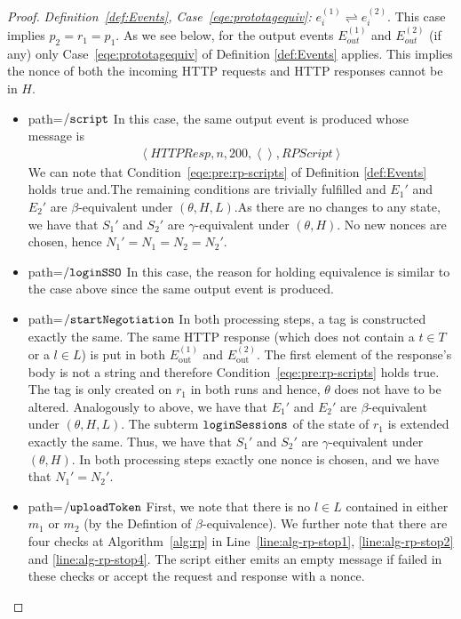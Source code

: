 \begin{proof}
    \noindent \emph{Definition~\ref{def:Events}, Case~\ref{eqe:prototagequiv}:}
    $e_i^{(1)}\rightleftharpoons e_i^{(2)}$. This case implies 
    $p_2=r_1=p_1$. As we see below, for the output events 
    $E_{out}^{(1)}$ and $E_{out}^{(2)}$ (if any) only 
    Case~\ref{eqe:prototagequiv} of Definition \ref{def:Events} 
    applies. This implies the nonce of both the incoming HTTP 
    requests and HTTP responses cannot be in $H$.
    \begin{itemize}
      \item path=$\mathtt{/script}$ 
        In this case, the same output 
        event is produced whose message is 
        \begin{equation}
          \begin{aligned}
            \left\langle HTTPResp,n,200,\left\langle\right\rangle,RPScript\right\rangle
          \end{aligned}
        \end{equation}
        We can note that Condition~\ref{eqe:pre:rp-scripts} of 
        Definition \ref{def:Events} 
        holds true and.The remaining conditions are trivially 
        fulfilled and $E_1\prime$ and $E_2\prime$ are 
        $\beta$-equivalent under $(\theta,H,L)$.As there are no 
        changes to any state, we have that $S_1\prime$ and 
        $S_2\prime$ are $\gamma$-equivalent under $(\theta,H)$. 
        No new nonces are chosen, hence $N_1\prime=N_1=N_2=N_2\prime$.
      \item path=$\mathtt{/loginSSO}$ 
        In this case, the reason for holding equivalence is 
        similar to the case above since the same output event 
        is produced.
      \item path=$\mathtt{/startNegotiation}$ 
        In both processing steps, a tag is constructed exactly 
        the same. The same HTTP response (which does not contain 
        a $t \in T$ or a $l \in L$) is put in both 
        $E^{(1)}_\text{out}$ and $E^{(2)}_\text{out}$. The first 
        element of the response's body is not a string and 
        therefore Condition~\ref{eqe:pre:rp-scripts} holds true. 
        The tag is only created on $r_1$ in both runs and hence, 
        $\theta$ does not have to be altered. 
        Analogously to above, we have that $E_1'$ and $E_2'$ are 
        $\beta$-equivalent under $(\theta,H,L)$. The subterm 
        $\mathtt{loginSessions}$ of the state of $r_1$ is extended 
        exactly the same. Thus, we have that $S_1'$ and $S_2'$ 
        are $\gamma$-equivalent under $(\theta,H)$. In both
        processing steps exactly one nonce is chosen, and we 
        have that $N_1' = N_2'$.
      \item path=$\mathtt{/uploadToken}$ 
        First, we note that there is no $l \in L$ contained in 
        either $m_1$ or $m_2$ (by the Defintion of 
        $\beta$-equivalence). We further note that there are 
        four checks at Algorithm~\ref{alg:rp} in
        Line~\ref{line:alg-rp-stop1}, %
        \ref{line:alg-rp-stop2} and \ref{line:alg-rp-stop4}.
        The script either emits an empty message if failed in
        these checks or accept the request and response with a 
        nonce.
  

\end{itemize}
\end{proof}
